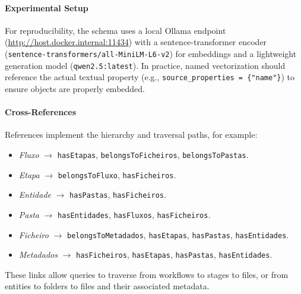 \paragraph{Experimental Setup}
For reproducibility, the schema uses a local Ollama endpoint (\url{http://host.docker.internal:11434}) with a sentence-transformer encoder (\texttt{sentence-transformers/all-MiniLM-L6-v2}) for embeddings and a lightweight generation model (\texttt{qwen2.5:latest}). In practice, named vectorization should reference the actual textual property (e.g., \texttt{source\_properties = \{\allowbreak "name"\}}) to ensure objects are properly embedded.

\paragraph{Cross-References}
References implement the hierarchy and traversal paths, for example:
\begin{itemize}
    \item \textit{Fluxo} \(\rightarrow\) \texttt{hasEtapas}, \texttt{belongsToFicheiros}, \texttt{belongsToPastas}.
    \item \textit{Etapa} \(\rightarrow\) \texttt{belongsToFluxo}, \texttt{hasFicheiros}.
    \item \textit{Entidade} \(\rightarrow\) \texttt{hasPastas}, \texttt{hasFicheiros}.
    \item \textit{Pasta} \(\rightarrow\) \texttt{hasEntidades}, \texttt{hasFluxos}, \texttt{hasFicheiros}.
    \item \textit{Ficheiro} \(\rightarrow\) \texttt{belongsToMetadados}, \texttt{hasEtapas}, \texttt{hasPastas}, \texttt{hasEntidades}.
    \item \textit{Metadados} \(\rightarrow\) \texttt{hasFicheiros}, \texttt{hasEtapas}, \texttt{hasPastas}, \texttt{hasEntidades}.
\end{itemize}
These links allow queries to traverse from workflows to stages to files, or from entities to folders to files and their associated metadata.

